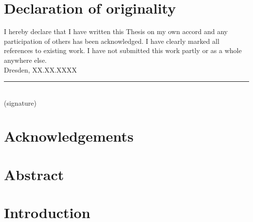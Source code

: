 \documentclass[12 pt, a4paper]{report}
\theoremstyle{definition}
\newcommand{\blankpage}{
\newpage
\thispagestyle{empty}
\addtocounter{page}{-1}
\mbox{}
\newpage
}
\begin{document}
\sloppy

\blankpage

\chapter*{Declaration of originality}
I hereby declare that I have written this Thesis on my own accord and any participation of others has been acknowledged. I have clearly marked all references to existing work. I have not submitted this work partly or as a whole anywhere else. \\

Dresden, XX.XX.XXXX \\
\rule{150 px}{0.5 px} \\
(signature)
\blankpage

\chapter*{Acknowledgements}
\lipsum[1]
\blankpage

%

\chapter*{Abstract}
\lipsum[1]

\tableofcontents
\pagebreak

{}

\chapter{Introduction}
\end{document}
